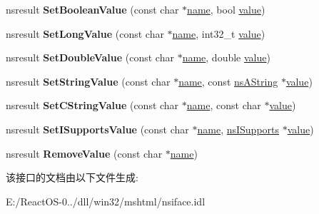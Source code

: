 \begin{DoxyCompactItemize}
\mbox{\label{interfacens_i_command_params_ac6b2f66032d3acafa10e3e9089bf67d3}} 
nsresult {\bfseries Set\+Boolean\+Value} (const char $\ast$\hyperlink{structname}{name}, bool \hyperlink{unionvalue}{value})
\item 
\mbox{\label{interfacens_i_command_params_a6ac89c1407e06850f6f7f9bf34cd20d3}} 
nsresult {\bfseries Set\+Long\+Value} (const char $\ast$\hyperlink{structname}{name}, int32\+\_\+t \hyperlink{unionvalue}{value})
\item 
\mbox{\label{interfacens_i_command_params_aab07e2680aa25f4b93744e8bd73c4a08}} 
nsresult {\bfseries Set\+Double\+Value} (const char $\ast$\hyperlink{structname}{name}, double \hyperlink{unionvalue}{value})
\item 
\mbox{\label{interfacens_i_command_params_a0720b37e90ade8ac53f09dd67eb4edc3}} 
nsresult {\bfseries Set\+String\+Value} (const char $\ast$\hyperlink{structname}{name}, const \hyperlink{structns_string_container}{ns\+A\+String} $\ast$\hyperlink{unionvalue}{value})
\item 
\mbox{\label{interfacens_i_command_params_a7dac5cc8345b519d7c92bdb9bb98477d}} 
nsresult {\bfseries Set\+C\+String\+Value} (const char $\ast$\hyperlink{structname}{name}, const char $\ast$\hyperlink{unionvalue}{value})
\item 
\mbox{\label{interfacens_i_command_params_a01b48604a0c886e8ec3522110eb781c5}} 
nsresult {\bfseries Set\+I\+Supports\+Value} (const char $\ast$\hyperlink{structname}{name}, \hyperlink{interfacens_i_supports}{ns\+I\+Supports} $\ast$\hyperlink{unionvalue}{value})
\item 
\mbox{\label{interfacens_i_command_params_af1ef2356f7940a91c5c17ab6d576db9e}} 
nsresult {\bfseries Remove\+Value} (const char $\ast$\hyperlink{structname}{name})
\end{DoxyCompactItemize}


该接口的文档由以下文件生成\+:\begin{DoxyCompactItemize}
\item 
E\+:/\+React\+O\+S-\/0../dll/win32/mshtml/nsiface.\+idl\end{DoxyCompactItemize}
